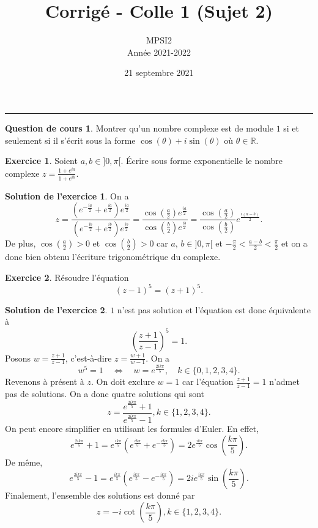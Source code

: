 \documentclass[a4paper, 11pt,openany]{article}%
\title{Corrigé - Colle 1 (Sujet 2)}
\author{MPSI2\\
Année 2021-2022}
\date{21 septembre 2021}
\theoremstyle{plain}
\theoremstyle{definition}
\newtheorem{cours}{Question de cours}
\newtheorem{exo}{Exercice}
\newtheorem{sol}{Solution de l'exercice}
\theoremstyle{remark}
\newcommand{\R}{\mathbb{R}}
\begin{document}
   \maketitle
      \rule{\linewidth}{0.5mm}


\begin{cours}
Montrer qu'un nombre complexe est de module $1$ si et seulement si il s'écrit sous la forme $\cos(\theta) + i \sin(\theta)$ où $\theta \in \R$.
\end{cours}


\begin{exo}
Soient $a,b \in ]0, \pi[$. Écrire sous forme exponentielle le nombre complexe $z = \frac{1+e^{ia}}{1+e^{ib}}$.
\end{exo}


\begin{sol}
On a
\[ z = \frac{(e^{-\frac{ia}{2}}+ e^{\frac{ia}{2}})e^{\frac{ia}{2}}}{(e^{-\frac{ib}{2}}+ e^{\frac{ib}{2}})e^{\frac{ib}{2}}} = \frac{\cos \left( \frac{a}{2} \right)e^{\frac{ia}{2}}}{\cos \left( \frac{b}{2} \right)e^{\frac{ib}{2}}} = \frac{\cos \left( \frac{a}{2} \right)}{\cos \left( \frac{b}{2} \right)} e^{\frac{i(a-b)}{2}}.\]
De plus, $\cos\left( \frac{a}{2} \right)>0$ et $\cos\left( \frac{b}{2} \right)>0$ car $a,\, b \in ]0, \pi [$ et $- \frac{\pi}{2} < \frac{a-b}{2} < \frac{\pi}{2}$ et on a donc bien obtenu l'écriture trigonométrique du complexe.
\end{sol}


\begin{exo}
Résoudre l'équation
\[ (z-1)^5 = (z+1)^5.\]
\end{exo}

\begin{sol}
$1$ n'est pas solution et l'équation est donc équivalente à 
\[ \left( \frac{z+1}{z-1} \right)^5=1.\]
 Posons $w=\frac{z+1}{z-1}$, c'est-à-dire $z= \frac{w+1}{w-1}$. On a 
 \[ w^5=1 \quad \Leftrightarrow \quad w=e^{\frac{2ik \pi}{5}}, \quad k \in \{0,1,2,3,4\}.\]
 Revenons à présent à $z$. On doit exclure $w=1$ car l'équation $\frac{z+1}{z-1}=1$ n'admet pas de solutions. On a donc quatre solutions qui sont 
 \[z= \frac{e^{\frac{2i k \pi}{5}} + 1}{e^{\frac{2ik \pi}{5}} - 1}, k \in \{1,2,3,4\}.\]
 On peut encore simplifier en utilisant les formules d'Euler. En effet,
 \[ e^{\frac{2ik\pi}{5}}+1=e^{\frac{ik\pi}{5}} \left( e^{\frac{ik\pi}{5}}+e^{-\frac{ik\pi}{5}} \right) = 2e^{\frac{ik\pi}{5}} \cos\left( \frac{k\pi}{5}\right).\]
  De même,
   \[ e^{\frac{2ik\pi}{5}}-1=e^{\frac{ik\pi}{5}} \left( e^{\frac{ik\pi}{5}}-e^{-\frac{ik\pi}{5}} \right) = 2ie^{\frac{ik\pi}{5}} \sin\left( \frac{k\pi}{5}\right).\]
   Finalement, l'ensemble des solutions est donné par
    \[z= -i \cot \left( \frac{k\pi}{5}\right), k \in \{1,2,3,4\}.\]
\end{sol}
\end{document}
